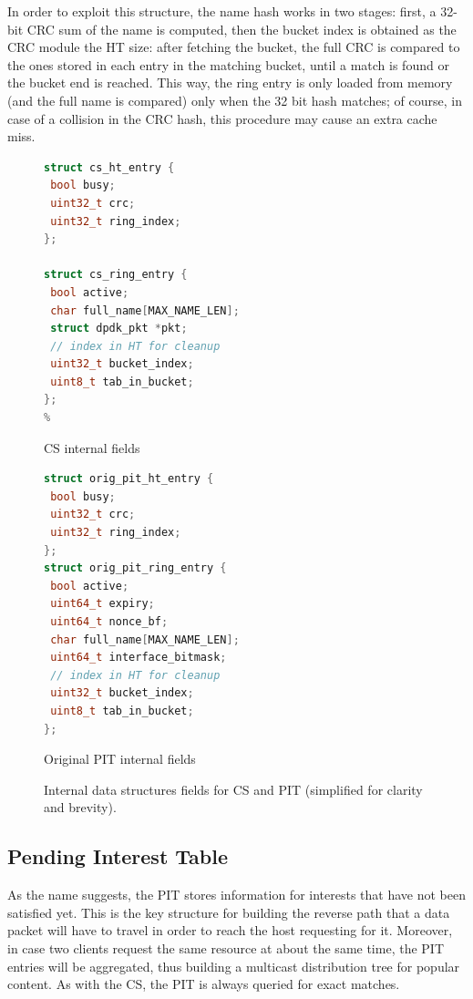 \documentclass[11pt,a4paper,twoside,titlepage,openany]{book}
\begin{document}
In order to exploit this structure, the name hash works in two stages: first, a 32-bit \gls{CRC} sum of the name is computed, then the bucket index is obtained as the CRC module the HT size: after fetching the bucket, the full \gls{CRC} is compared to the ones stored in each entry in the matching bucket, until a match is found or the bucket end is reached. This way, the ring entry is only loaded from memory (and the full name is compared) only when the 32 bit hash matches; of course, in case of a collision in the CRC hash, this procedure may cause an extra cache miss.

\begin{figure}[tb]
  \captionsetup{type=lstlisting}
  \begin{sublstlisting}[t]{.5\linewidth}
  \begin{lstlisting}[language=c,escapechar=\%]
struct cs_ht_entry {
 bool busy;
 uint32_t crc;
 uint32_t ring_index;
};

struct cs_ring_entry {
 bool active;
 char full_name[MAX_NAME_LEN];
 struct dpdk_pkt *pkt;
 // index in HT for cleanup
 uint32_t bucket_index;
 uint8_t tab_in_bucket;
};
%
    \end{lstlisting}
    \caption{CS internal fields}\label{lst:augustus.cs}
  \end{sublstlisting}%
  \begin{sublstlisting}[t]{.5\linewidth}
  \begin{lstlisting}[language=c]
struct orig_pit_ht_entry {
 bool busy;
 uint32_t crc;
 uint32_t ring_index;
};
struct orig_pit_ring_entry {
 bool active;
 uint64_t expiry;
 uint64_t nonce_bf;
 char full_name[MAX_NAME_LEN];
 uint64_t interface_bitmask;
 // index in HT for cleanup
 uint32_t bucket_index;
 uint8_t tab_in_bucket;
};
    \end{lstlisting}
    \caption{Original PIT internal fields}\label{lst:augustus.oldpit}
  \end{sublstlisting}
  \caption[CS and original PIT internal data structures fields]{Internal data structures fields for CS and PIT (simplified for clarity and brevity).}\label{lst:augustus.cs_oldpit}
\end{figure}

\subsection{Pending Interest Table}\label{sec:augustus.pit}
As the name suggests, the \gls{PIT} stores information for interests that have not been satisfied yet. This is the key structure for building the reverse path that a data packet will have to travel in order to reach the host requesting for it. Moreover, in case two clients request the same resource at about the same time, the PIT entries will be aggregated, thus building a multicast distribution tree for popular content.
As with the \gls{CS}, the PIT is always queried for exact matches.
\end{document}

